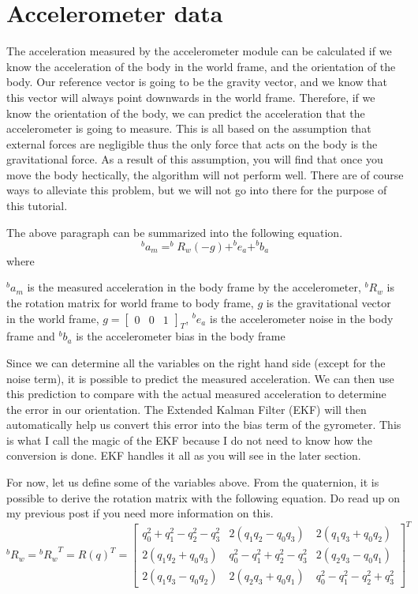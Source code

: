 \documentclass[a4paper,12pt]{book}
\begin{document}
\section{Accelerometer data}
The acceleration measured by the accelerometer module can be calculated if we know the acceleration of the body in the world frame, and the orientation of the body. Our reference vector is going to be the gravity vector, and we know that this vector will always point downwards in the world frame. Therefore, if we know the orientation of the body, we can predict the acceleration that the accelerometer is going to measure. This is all based on the assumption that external forces are negligible thus the only force that acts on the body is the gravitational force. As a result of this assumption, you will find that once you move the body hectically, the algorithm will not perform well. There are of course ways to alleviate this problem, but we will not go into there for the purpose of this tutorial.

The above paragraph can be summarized into the following equation.
\begin{equation}
    ^ba_m = ^bR_w(-g) + ^be_a + ^bb_a
\end{equation}
where

$^ba_m$ is the measured acceleration in the body frame by the accelerometer, $^bR_w$ is the rotation matrix for world frame to body frame, $g$ is the gravitational vector in the world frame, $g=\begin{bmatrix} 0 &0 &1\end{bmatrix}_T$, $^be_a$ is the accelerometer noise in the body frame and $^bb_a$ is the accelerometer bias in the body frame

Since we can determine all the variables on the right hand side (except for the noise term), it is possible to predict the measured acceleration. We can then use this prediction to compare with the actual measured acceleration to determine the error in our orientation. The Extended Kalman Filter (EKF) will then automatically help us convert this error into the bias term of the gyrometer. This is what I call the magic of the EKF because I do not need to know how the conversion is done. EKF handles it all as you will see in the later section.

For now, let us define some of the variables above. From the quaternion, it is possible to derive the rotation matrix with the following equation. Do read up on my previous post if you need more information on this.
\begin{equation}
    ^bR_w = {^bR_w}^T = R(q)^T = \begin{bmatrix} q_0^2+q_1^2-q_2^2-q_3^2 & 2(q_1q_2-q_0q_3) & 2(q_1q_3+q_0q_2) \\ 2(q_1q_2+q_0q_3) & q_0^2-q_1^2+q_2^2-q_3^2 & 2(q_2q_3-q_0q_1) \\ 2(q_1q_3-q_0q_2) & 2(q_2q_3+q_0q_1) & q_0^2-q_1^2-q_2^2+q_3^2 \end{bmatrix}^T
\end{equation}
\end{document}

